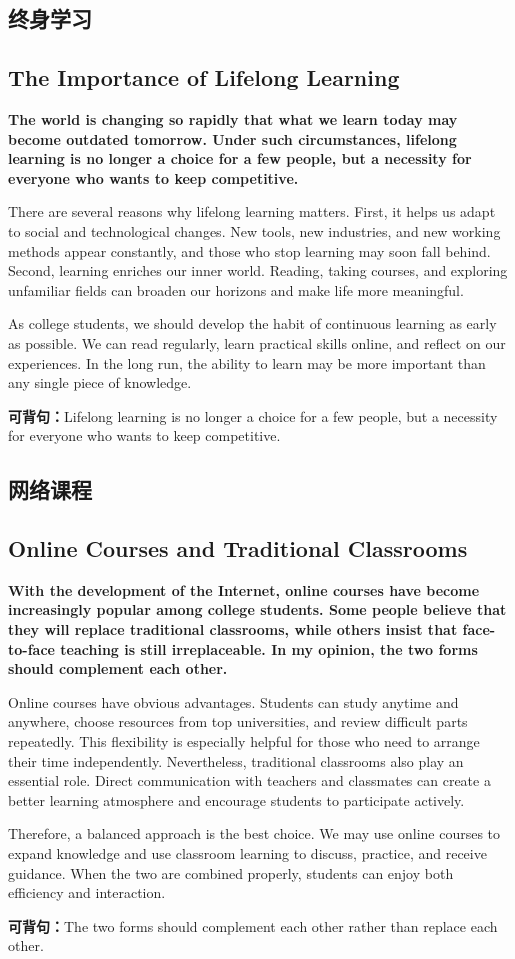 ﻿\documentclass[UTF8,zihao=-4]{ctexart}
\newenvironment{essayblock}{\Needspace{0.46\textheight}\begin{samepage}}{\end{samepage}\vspace{0.2em}}
\newcommand{\essay}[3]{\section{#1}\subsection{#2}\textbf{#3}\par}
\newcommand{\keysentence}[1]{\begin{sentbox}\textbf{可背句：}#1\end{sentbox}}
\begin{document}
\begin{essayblock}
\essay{终身学习}{The Importance of Lifelong Learning}{The world is changing so rapidly that what we learn today may become outdated tomorrow. Under such circumstances, lifelong learning is no longer a choice for a few people, but a necessity for everyone who wants to keep competitive.}

There are several reasons why lifelong learning matters. First, it helps us adapt to social and technological changes. New tools, new industries, and new working methods appear constantly, and those who stop learning may soon fall behind. Second, learning enriches our inner world. Reading, taking courses, and exploring unfamiliar fields can broaden our horizons and make life more meaningful.

As college students, we should develop the habit of continuous learning as early as possible. We can read regularly, learn practical skills online, and reflect on our experiences. In the long run, the ability to learn may be more important than any single piece of knowledge.

\keysentence{Lifelong learning is no longer a choice for a few people, but a necessity for everyone who wants to keep competitive.}
\end{essayblock}

\begin{essayblock}
\essay{网络课程}{Online Courses and Traditional Classrooms}{With the development of the Internet, online courses have become increasingly popular among college students. Some people believe that they will replace traditional classrooms, while others insist that face-to-face teaching is still irreplaceable. In my opinion, the two forms should complement each other.}

Online courses have obvious advantages. Students can study anytime and anywhere, choose resources from top universities, and review difficult parts repeatedly. This flexibility is especially helpful for those who need to arrange their time independently. Nevertheless, traditional classrooms also play an essential role. Direct communication with teachers and classmates can create a better learning atmosphere and encourage students to participate actively.

Therefore, a balanced approach is the best choice. We may use online courses to expand knowledge and use classroom learning to discuss, practice, and receive guidance. When the two are combined properly, students can enjoy both efficiency and interaction.

\keysentence{The two forms should complement each other rather than replace each other.}
\end{essayblock}
\end{document}

